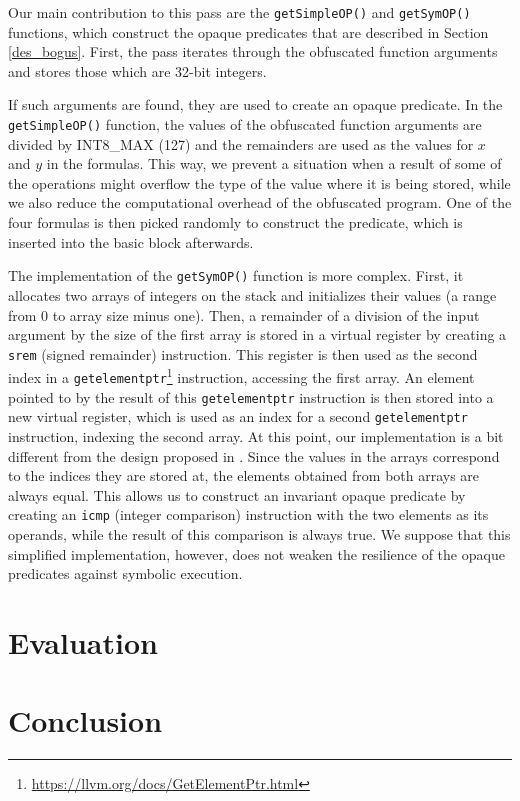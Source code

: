 \documentclass[
  digital, %
  table,   %
  twoside, %
  nolof,     %
  nolot,     %
]{fithesis3}
\theoremstyle{definition}
\begin{document}
Our main contribution to this pass are the \texttt{getSimpleOP()} and \texttt{getSymOP()} functions, which construct the opaque predicates that are described in Section \ref{des_bogus}. First, the pass iterates through the obfuscated function arguments and stores those which are 32-bit integers. 

If such arguments are found, they are used to create an opaque predicate. In the \texttt{getSimpleOP()} function, the values of the obfuscated function arguments are divided by INT8\_MAX (127) and the remainders are used as the values for $x$ and $y$ in the formulas. This way, we prevent a situation when a result of some of the operations might overflow the type of the value where it is being stored, while we also reduce the computational overhead of the obfuscated program. One of the four formulas is then picked randomly to construct the predicate, which is inserted into the basic block afterwards. 

The implementation of the \texttt{getSymOP()} function is more complex. First, it allocates two arrays of integers on the stack and initializes their values (a range from 0 to array size minus one). Then, a remainder of a division of the input argument by the size of the first array is stored in a virtual register by creating a \texttt{srem} (signed remainder) instruction. This register is then used as the second index in a \texttt{getelementptr}\footnote{\url{https://llvm.org/docs/GetElementPtr.html}} instruction, accessing the first array. An element pointed to by the result of this \texttt{getelementptr} instruction is then stored into a new virtual register, which is used as an index for a second \texttt{getelementptr} instruction, indexing the second array. At this point, our implementation is a bit different from the design proposed in \cite{bi_opaque}. Since the values in the arrays correspond to the indices they are stored at, the elements obtained from both arrays are always equal. This allows us to construct an invariant opaque predicate by creating an \texttt{icmp} (integer comparison) instruction with the two elements as its operands, while the result of this comparison is always true. We suppose that this simplified implementation, however, does not weaken the resilience of the opaque predicates against symbolic execution. 

\chapter{Evaluation}

\chapter{Conclusion}


\printbibliography[heading=bibintoc] %
\end{document}
